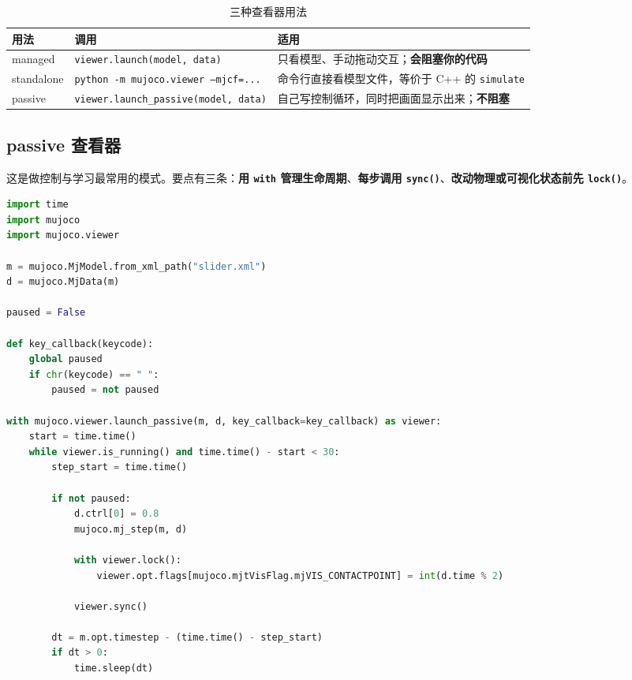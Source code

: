 \begin{table}[H]
	\centering
	\caption{三种查看器用法}
	\label{tab:Python:viewer}
	\footnotesize
	\begin{tabular}{>{\raggedright\arraybackslash}p{2.6cm}>{\raggedright\arraybackslash}p{5.0cm}>{\raggedright\arraybackslash}p{6.6cm}}
		\hline
		用法 & 调用 & 适用 \\
		\hline
		managed & \texttt{viewer.launch(model, data)} & 只看模型、手动拖动交互；\textbf{会阻塞你的代码} \\
		standalone & \texttt{python -m mujoco.viewer --mjcf=...} & 命令行直接看模型文件，等价于 C++ 的 \texttt{simulate} \\
		passive & \texttt{viewer.launch\_passive(model, data)} & 自己写控制循环，同时把画面显示出来；\textbf{不阻塞} \\
		\hline
	\end{tabular}
\end{table}

\subsection{passive 查看器}

这是做控制与学习最常用的模式。要点有三条：\textbf{用 \texttt{with} 管理生命周期}、\textbf{每步调用 \texttt{sync()}}、\textbf{改动物理或可视化状态前先 \texttt{lock()}}。

\begin{lstlisting}[style=code, language=Python]
import time
import mujoco
import mujoco.viewer

m = mujoco.MjModel.from_xml_path("slider.xml")
d = mujoco.MjData(m)

paused = False

def key_callback(keycode):
    global paused
    if chr(keycode) == " ":
        paused = not paused

with mujoco.viewer.launch_passive(m, d, key_callback=key_callback) as viewer:
    start = time.time()
    while viewer.is_running() and time.time() - start < 30:
        step_start = time.time()

        if not paused:
            d.ctrl[0] = 0.8
            mujoco.mj_step(m, d)

            with viewer.lock():
                viewer.opt.flags[mujoco.mjtVisFlag.mjVIS_CONTACTPOINT] = int(d.time % 2)

            viewer.sync()

        dt = m.opt.timestep - (time.time() - step_start)
        if dt > 0:
            time.sleep(dt)
\end{lstlisting}


